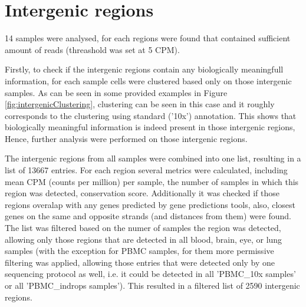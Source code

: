 \section{Intergenic regions}
14 samples were analysed, for each regions were found that contained sufficient amount of reads (threashold was set at 5 CPM).

Firstly, to check if the intergenic regions contain any biologically meaningfull information,
for each sample cells were clustered based only on those intergenic samples.
As can be seen in some provided examples in Figure \ref{fig:intergenicClustering},
clustering can be seen in this case and it roughly corresponds to the clustering using standard ('10x') annotation.
This shows that biologically meaningful information is indeed present in those intergenic regions,
Hence, further analysis were performed on those intergenic regions.

The intergenic regions from all samples were combined into one list, resulting in a list of 13667 entries.
For each region several metrics were calculated, including mean CPM (counts per million) per sample,
the number of samples in which this region was detected, conservation score.
Additionally it was checked if those regions overalap with any genes predicted by gene predictions tools,
also, closest genes on the same and opposite strands (and distances from them) were found.
The list was filtered based on the numer of samples the region was detected, allowing only those regions that are detected in all
blood, brain, eye, or lung samples (with the exception for PBMC samples,
for them more permissive filtering was applied, allowing those entries that were detected only by one sequencing protocol as well,
i.e. it could be detected in all 'PBMC\_10x samples' or all 'PBMC\_indrops samples').
This resulted in a filtered list of 2590 intergenic regions.

